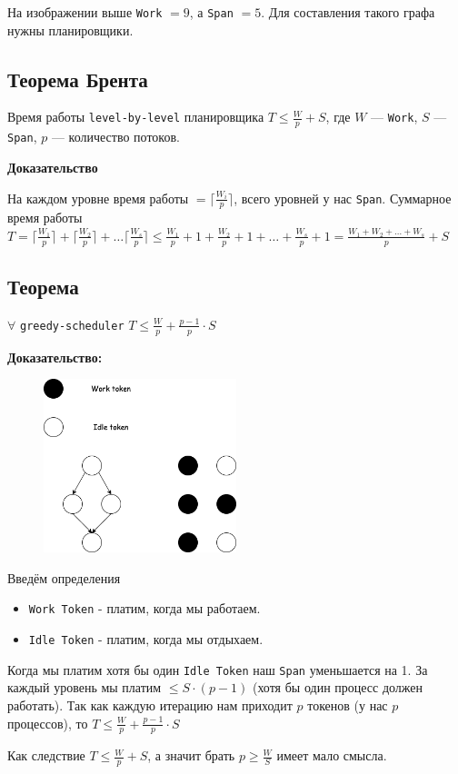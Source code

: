 \documentclass[11pt]{article}
\begin{document}
    На изображении выше \texttt{Work} $= 9$, а \texttt{Span} $= 5$.
    Для составления такого графа нужны планировщики.

    \subsection*{Теорема Брента}

    Время работы \texttt{level-by-level} планировщика $T \leq \frac{W}{p} + S$,
    где $W$ --- \texttt{Work}, $S$ --- \texttt{Span}, $p$ --- количество потоков.

    \textbf{Доказательство}

    На каждом уровне время работы $= \lceil \frac{W_i}{p} \rceil$,
    всего уровней у нас \texttt{Span}.
    Суммарное время работы $T = \lceil \frac{W_1}{p} \rceil + \lceil \frac{W_2}{p} \rceil + \dots \lceil \frac{W_s}{p} \rceil \leq \frac{W_1}{p} + 1 + \frac{W_2}{p} + 1 + \dots + \frac{W_s}{p} + 1 = \frac{W_1 + W_2 + \dots + W_s}{p} + S$

    \subsection*{Теорема}

    $\forall$ \texttt{greedy-scheduler} $T \leq \frac{W}{p} + \frac{p-1}{p} \cdot S$

    \textbf{Доказательство:}

    \begin{figure}[h!]
        \centering
        \includegraphics[width=0.5\textwidth]{Pictures/Greedy Scheduler}
        \label{fig:greedy_scheduler}
    \end{figure}

    Введём определения
    \begin{itemize}
        \item \texttt{Work Token} - платим, когда мы работаем.
        \item \texttt{Idle Token} - платим, когда мы отдыхаем.
    \end{itemize}

    Когда мы платим хотя бы один \texttt{Idle Token} наш \texttt{Span} уменьшается на 1.
    За каждый уровень мы платим $\leq S \cdot (p - 1)$ (хотя бы один процесс должен работать).
    Так как каждую итерацию нам приходит $p$ токенов (у нас $p$ процессов), то $T \leq \frac{W}{p} + \frac{p-1}{p} \cdot S$

    Как следствие $T \leq \frac{W}{p} + S$, а значит брать $p \geq \frac{W}{S}$ имеет мало смысла.
\end{document}
